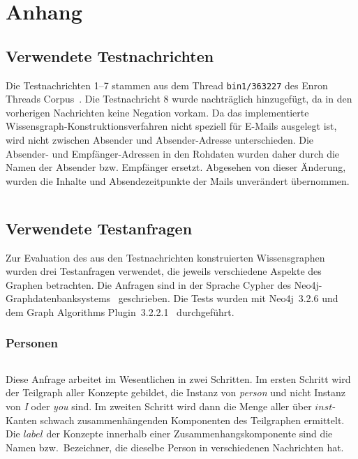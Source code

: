 
\chapter{Anhang}%
\label{sec:appendix}

\section{Verwendete Testnachrichten}%
\label{sec:appendix:msgs}

Die Testnachrichten 1--7 stammen aus dem Thread \texttt{bin1/363227} des Enron Threads Corpus~\cite{EnronThreads}.
Die Testnachricht 8 wurde nachträglich hinzugefügt, da in den vorherigen Nachrichten keine Negation vorkam.
Da das implementierte Wissensgraph-Konstruktionsverfahren nicht speziell für E-Mails ausgelegt ist, wird nicht zwischen Absender und Absender-Adresse unterschieden.
Die Absender- und Empfänger-Adressen in den Rohdaten wurden daher durch die Namen der Absender bzw. Empfänger ersetzt.
Abgesehen von dieser Änderung, wurden die Inhalte und Absendezeitpunkte der Mails unverändert übernommen.
\inputminted{clojure}{data/evaluation/testdata.clj}

\section{Verwendete Testanfragen}%
\label{sec:appendix:queries}

Zur Evaluation des aus den Testnachrichten konstruierten Wissensgraphen wurden drei Testanfragen verwendet, die jeweils verschiedene Aspekte des Graphen betrachten.
Die Anfragen sind in der Sprache Cypher des Neo4j-Graphdatenbanksystems~\cite{Neo4j} geschrieben.
Die Tests wurden mit Neo4j~3.2.6 und dem Graph Algorithms Plugin~3.2.2.1~\cite{GraphAlgo} durchgeführt.

\subsection{Personen}%
\label{sec:appendix:queries:people}

\inputminted{cypher}{data/evaluation/people.cql}
Diese Anfrage arbeitet im Wesentlichen in zwei Schritten.
Im ersten Schritt wird der Teilgraph aller Konzepte gebildet, die Instanz von \textit{person} und nicht Instanz von \textit{I} oder \textit{you} sind.
Im zweiten Schritt wird dann die Menge aller über $inst$-Kanten schwach zusammenhängenden Komponenten des Teilgraphen ermittelt.
Die $label$ der Konzepte innerhalb einer Zusammenhangskomponente sind die Namen bzw.\ Bezeichner, die dieselbe Person in verschiedenen Nachrichten hat.

